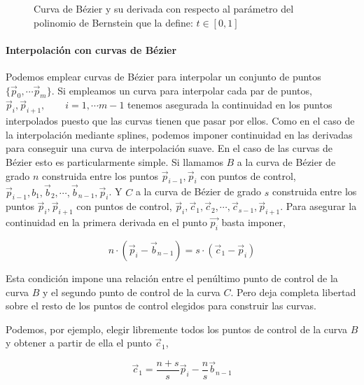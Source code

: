 \begin{figure}
\centering
{} \qquad 
{}
\caption{Curva de Bézier y su derivada con respecto al parámetro del polinomio de Bernstein que la define: $t \in [0,1]$} 
\label{fig:bzder}
\end{figure} 
\begin{paracol}{2}
\paragraph{Interpolación con curvas de Bézier} Podemos emplear curvas de Bézier para interpolar un conjunto de puntos $\lbrace \vec{p}_0, \cdots  \vec{p}_m\rbrace$. Si empleamos un curva para interpolar cada par de puntos, $\vec{p}_i, \vec{p}_{i+1}, \qquad i =1, \cdots m-1$ tenemos asegurada la continuidad en los puntos interpolados puesto que las curvas tienen que pasar por ellos. Como en el caso de la interpolación mediante splines, podemos imponer continuidad en las derivadas para conseguir una curva de interpolación suave. En el caso de las curvas de Bézier esto es particularmente simple. Si llamamos $B$ a la curva de Bézier de grado $n$ construida entre los puntos $\vec{p}_{i-1}, \vec{p}_{i}$  con puntos de control, $\vec{p}_{i-1}, b_1, \vec{b}_2,\cdots, \vec{b}_{n-1},\vec{p}_{i}$. Y  $C$ a la curva de Bézier de grado $s$ construida entre los puntos $\vec{p}_{i}, \vec{p}_{i+1}$  con puntos de control, $\vec{p}_{i}, \vec{c}_1, \vec{c}_2,\cdots, \vec{c}_{s-1},\vec{p}_{i+1}$. Para asegurar la continuidad en la primera derivada en el punto $\vec{p_i}$ basta imponer,
\end{paracol}
\begin{equation*}
n\cdot\left(\vec{p}_i-\vec{b}_{n-1}\right) = s\cdot\left(\vec{c}_1-\vec{p}_i\right)
\end{equation*}
\begin{paracol}{2}
Esta condición impone una relación entre el penúltimo punto de control de la curva $B$ y el segundo punto de control de la curva $C$. Pero deja completa libertad sobre el resto de los puntos de control elegidos para construir las curvas.

Podemos, por ejemplo, elegir libremente todos los puntos de control de la curva $B$ y obtener a partir de ella el punto $\vec{c}_1$,
\end{paracol}
\begin{equation*}
\vec{c}_1 = \frac{n+s}{s}\vec{p}_i - \frac{n}{s}\vec{b}_{n-1}
\end{equation*}

